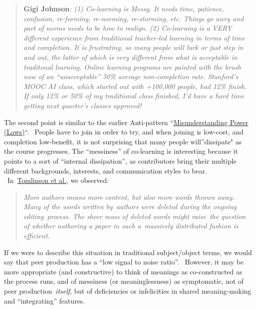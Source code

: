 \begin{quote}
\textbf{Gigi Johnson}\emph{: (1) Co-learning is Messy. It needs time,
patience, confusion, re-forming, re-norming, re-storming, etc. Things go
awry and part of norms needs to be how to realign. (2) Co-learning is a
VERY different experience from traditional teacher-led learning in terms
of time and completion. It is frustrating, so many people will lurk or
just step in and out, the latter of which is very different from what is
acceptable in traditonal learning. Online learning programs are painted
with the brush now of an ``unacceptable'' 50\% average non-completion
rate. Stanford's MOOC AI class, which started out with +100,000 people,
had 12\% finish.~ If only 12\% or 50\% of my traditional class finished,
I'd have a hard time getting next quarter's classes approved!}
\end{quote}

The second point is similar to the earlier Anti-pattern
``\href{http://socialmediaclassroom.com/host/peeragogy/forum/anti-patterns-concerns-complaints-and-critiques\#comment-1854}{Misunderstanding
Power (Laws)}``. ~People have to join in order to try, and when joining
is low-cost, and completion low-benefit, it is not surprising that many
people will''dissipate" as the course progresses. The ``messiness'' of
co-learning is interesting because it points to a sort of ``internal
dissipation'', as contributors bring their multiple different
backgrounds, interests, and communication styles to bear.
~In~\href{http://www.altchi.org/submissions/submission\_wmt\_0.pdf}{Tomlinson
et al.}, we observed:

\begin{quote}
\emph{More authors means more content, but also more words thrown away.
Many of the words written by~authors were deleted during the ongoing
editing~process. The sheer mass of deleted words might raise~the
question of whether authoring a paper in such a~massively distributed
fashion is efficient.}
\end{quote}

If we were to describe this situation in traditional subject/object
terms, we would say that peer production has a ``low signal to noise
ratio''. ~However, it may be more appropriate (and constructive) to
think of meanings as co-constructed as the process runs, and of
messiness (or meaninglessness) as symptomatic, not of peer
production~\emph{itself}, but of deficiencies or infelicities in shared
meaning-making and ``integrating'' features.
